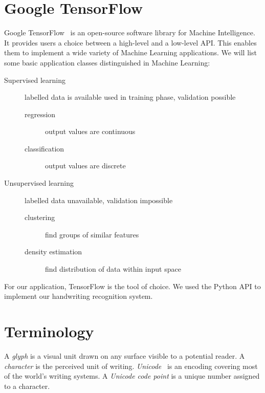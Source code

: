 \section{Google TensorFlow}
\label{sec:nn-tensorflow}
%
Google TensorFlow~\cite{abadi2016tensorflow} is an open-source software library for Machine Intelligence.
It provides users a choice between a high-level and a low-level API.
This enables them to implement a wide variety of Machine Learning applications.
We will list some basic application classes distinguished in Machine Learning:
\begin{description}
  \item[Supervised learning]
    labelled data is available used in training phase, validation possible
    \begin{description}
      \item[regression] output values are continuous
      \item[classification] output values are discrete
    \end{description}
  \item[Unsupervised learning]
    labelled data unavailable, validation impossible
    \begin{description}
      \item[clustering] find groups of similar features
      \item[density estimation] find distribution of data within input space
    \end{description}
\end{description}

For our application, TensorFlow is the tool of choice.
We used the Python API to implement our handwriting recognition system.

\section{Terminology}
\label{sec:nn-terminology}
%
A \emph{glyph} is a visual unit drawn on any surface visible to a potential reader.
A \emph{character} is the perceived unit of writing.
\emph{Unicode}~\cite{unicode} is an encoding covering most of the world's writing systems.
A \emph{Unicode code point} is a unique number assigned to a character.

